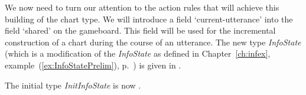 We now need to turn our attention to the action rules that will
achieve this building of the chart type.  We will introduce a field
`current-utterance' into the field `shared' on the gameboard.  This
field will be used for the incremental construction of a chart during
the course of an utterance.  %
The
new type \textit{InfoState} (which is a modification of the
\textit{InfoState} as defined in Chapter~\ref{ch:infex},
example~(\ref{ex:InfoStatePrelim}), p.~\pageref{ex:InfoStatePrelim}) is given in \nexteg{}.
\begin{ex} 
\end{ex}
The initial type \textit{InitInfoState} is now \nexteg{}.
